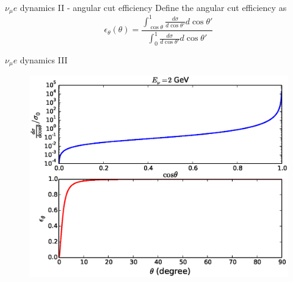 \documentclass{beamer}
\begin{document}
\begin{frame}{$\nu_\mu e$ dynamics II - angular cut efficiency}
Define the angular cut efficiency as
  \begin{equation}
    \epsilon_\theta(\theta)=\frac{\int_{\cos\theta}^1 \frac{d\sigma}{d\cos\theta'}d\cos\theta'}{\int_0^1 \frac{d\sigma}{d\cos\theta'}d\cos\theta'}
  \end{equation}
\end{frame}

\begin{frame}{$\nu_\mu e$ dynamics III}
\begin{figure}
\centering
  \includegraphics[width=.9\textwidth]{figures/xsec_cut_eff.eps}
\end{figure}
\end{frame}
\end{document}
